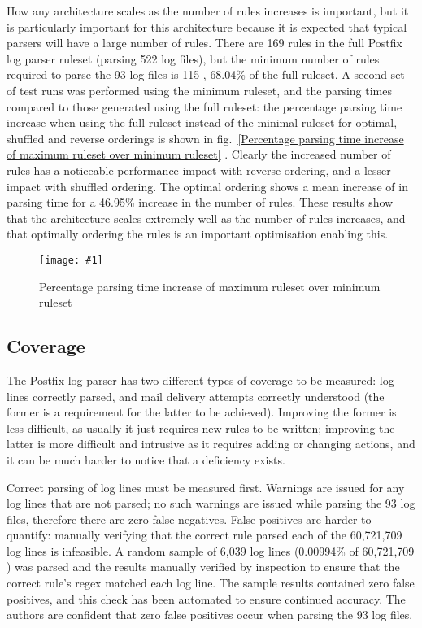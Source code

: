 \documentclass{svmult}
\newcommand{\showgraph}[3]{%
    \begin{figure}[btp]%
        \texttt{[image: \#1]}%
        \caption{#2}\label{#3}%
    \end{figure}%
}
\newcommand{\refwithlabel}[2]{%
    #1~\vref{#2}%
}
\newcommand{\graphref}[1]{%
    \refwithlabel{fig.}{#1}%
}
\newcommand{\numberOFlogFILES}[0]{%
    93%
}
\newcommand{\numberOFrules}[0]{%
    169%
}
\newcommand{\numberOFrulesMINIMUM}[0]{%
    115%
}
\newcommand{\numberOFlogFILESall}[0]{%
    522%
}
\newcommand{\numberOFrulesMINIMUMpercentage}[0]{%
    68.04\%%
}
\newcommand{\numberOFrulesMAXIMUMpercentage}[0]{%
    46.95\%%
}
\newcommand{\numberOFlogLINES}[0]{%
    60,721,709%
}
\begin{document}
How any architecture scales as the number of rules increases is important,
but it is particularly important for this architecture because it is
expected that typical parsers will have a large number of rules.  There are
\numberOFrules{} rules in the full Postfix log parser ruleset (parsing
\numberOFlogFILESall{} log files), but the minimum number of rules required
to parse the \numberOFlogFILES{} log files is \numberOFrulesMINIMUM{},
\numberOFrulesMINIMUMpercentage{} of the full ruleset.  A second set of
test runs was performed using the minimum ruleset, and the parsing times
compared to those generated using the full ruleset: the percentage parsing
time increase when using the full ruleset instead of the minimal ruleset
for optimal, shuffled and reverse orderings is shown in
\graphref{Percentage parsing time increase of maximum ruleset over minimum
ruleset}.  Clearly the increased number of rules has a noticeable
performance impact with reverse ordering, and a lesser impact with shuffled
ordering.  The optimal ordering shows a mean increase of
 in parsing time for a
\numberOFrulesMAXIMUMpercentage{} increase in the number of rules.  These
results show that the architecture scales extremely well as the number of
rules increases, and that optimally ordering the rules is an important
optimisation enabling this.
\showgraph{build/graph-full-ruleset-vs-minimum-ruleset}{Percentage parsing
time increase of maximum ruleset over minimum ruleset}{Percentage parsing
time increase of maximum ruleset over minimum ruleset}

\subsection{Coverage}

\label{coverage}

The Postfix log parser has two different types of coverage to be measured:
log lines correctly parsed, and mail delivery attempts correctly understood
(the former is a requirement for the latter to be achieved).  Improving the
former is less difficult, as usually it just requires new rules to be
written; improving the latter is more difficult and intrusive as it
requires adding or changing actions, and it can be much harder to notice
that a deficiency exists.

Correct parsing of log lines must be measured first.  Warnings are issued
for any log lines that are not parsed; no such warnings are issued while
parsing the \numberOFlogFILES{} log files, therefore there are zero false
negatives.  False positives are harder to quantify: manually verifying that
the correct rule parsed each of the \numberOFlogLINES{} log lines is
infeasible.  A random sample of 6,039 log lines (0.00994\% of
\numberOFlogLINES{}) was parsed and the results manually verified by
inspection to ensure that the correct rule's regex matched each log line.
The sample results contained zero false positives, and this check has been
automated to ensure continued accuracy.  The authors are confident that
zero false positives occur when parsing the \numberOFlogFILES{} log files.
\end{document}
